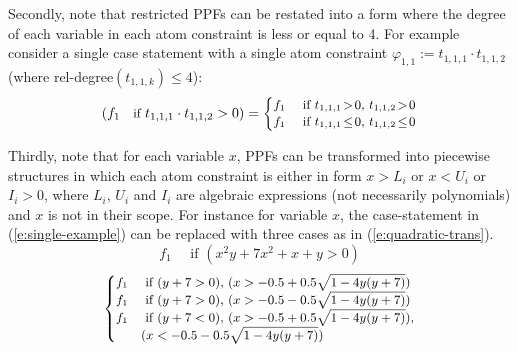\documentclass[letterpaper]{article}
\newcommand{\case}[2]{#2 &\text{ if } #1}%
\newcommand{\singlecase}[2]{#2 \quad \text{ if } #1}
\begin{document}
Secondly, note that restricted PPFs can be restated into a form where
the degree of each variable in each atom constraint is less or equal to 4.
For example consider a single case statement with a single atom constraint 
$\varphi_{1,1} := t_{1,1,1} \cdot t_{1,1,2}$ (where rel-degree$(t_{1,1,k})\leq4$):
\begin{align*}
{\footnotesize
\left(
f_1 \quad \text{if } t_{1,1,1} \cdot t_{1,1,2} > 0
\right)
 =
\begin{cases}
  \case{t_{1,1,1} \!>\! 0, \, t_{1,1,2} \!>\! 0 }{f_1} \\ 
  \case{t_{1,1,1} \!\leq\! 0, \, t_{1,1,2} \!\leq\! 0 }{f_1} 
 \end{cases} 
}
\end{align*}

Thirdly, note that for each variable $x$, 
PPFs can be transformed into piecewise structures 
in which each atom constraint is either in form $x>L_i$ or $x<U_i$ or $I_i>0$, 
where $L_i$, $U_i$ and $I_i$ are 
algebraic expressions (not necessarily polynomials) and $x$ is not in their scope. 
For instance for variable $x$, the case-statement in (\ref{e:single-example})
can be replaced with three cases as in (\ref{e:quadratic-trans}).
\begin{equation}
\label{e:single-example}
\singlecase{(x^2 y + 7x^2 + x + y > 0)}{f_1}
\end{equation}
\begin{align}
\label{e:quadratic-trans}
{\footnotesize 
\begin{cases}
  \case{(y+7>0), \, (x> -0.5 + 0.5\sqrt{1 - 4y(y+7)}) }{f_1} \\ 
  \case{(y+7>0), \, (x> -0.5 - 0.5\sqrt{1 - 4y(y+7)}) }{f_1} \\ 
  \case{(y+7<0), \, (x > -0.5 + 0.5\sqrt{1 - 4y(y+7)}),\\
& (x < -0.5 - 0.5\sqrt{1 - 4y(y+7)}) }{f_1} \\ 
 \end{cases}
}
\end{align}
\end{document}
